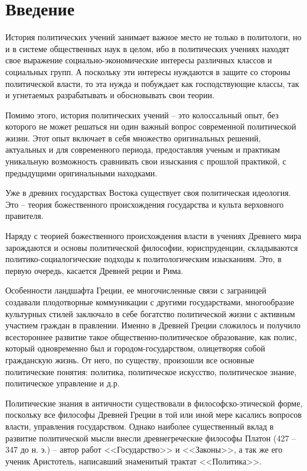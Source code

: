 \chapter{Введение}
	История политических учений занимает важное место не только в политологи, 
	но и в системе общественных наук в целом, ибо в политических учениях 
	находят свое выражение социально-экономические интересы различных классов 
	и социальных групп. А поскольку эти интересы нуждаются в защите со 
	стороны политической власти, то эта нужда и побуждает как господствующие 
	классы, так и угнетаемых разрабатывать и обосновывать свои теории.

	Помимо этого, история политических учений -- это колоссальный опыт, без 
	которого не может решаться ни один важный вопрос современной политической 
	жизни. Этот опыт включает в себя множество оригинальных решений, 
	актуальных и для современного периода, предоставляя ученым и практикам 
	уникальную возможность сравнивать свои изыскания с прошлой практикой, с 
	предыдущими оригинальными находками.

	Уже в древних государствах Востока существует своя политическая идеология. 
	Это -- теория божественного происхождения государства и культа верховного 
	правителя.

	Наряду с теорией божественного происхождения власти в учениях Древнего мира 
	зарождаются и основы политической философии, юриспруденции, складываются 
	политико-социалогические подходы к политологическим изысканиям. Это, в 
	первую очередь, касается Древней реции и Рима.

	Особенности ландшафта Греции, ее многочисленные связи с заграницей 
	создавали плодотворные коммуникации с другими государствами, многообразие 
	культурных стилей заключало в себе богатство политической жизни с активным 
	участием граждан в правлении. Именно в Древней Греции сложилось и получило 
	всестороннее развитие такое общественно-политическое образование, как 
	полис, который одновременно был и городом-государством, олицетворяя собой 
	гражданскую жизнь. От него, по существу, произошли все основные 
	политические понятия: политика, политическое искусство, политическое 
	знание, политическое управление и д.р.

	Политические знания в античности существовали в философско-этической форме, 
	поскольку все философы Древней Греции в той или иной мере касались вопросов 
	власти, управления государством. Однако наиболее существенный вклад в 
	развитие политической мысли внесли древнегреческие философы Платон 
	(427 -- 347 до н. э.) -- автор работ <<Государство>> и <<Законы>>, а так же 
	его ученик Аристотель, написавший знаменитый трактат <<Политика>>.

